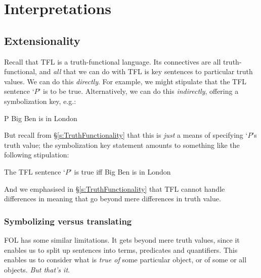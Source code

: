 \part{Interpretations}
\label{ch.semantics}


\chapter{Extensionality}\label{s:Interpretations}

Recall that TFL is a truth-functional language. Its connectives are all truth-functional, and \emph{all} that we can do with TFL is key sentences to particular truth values. We can do this \emph{directly}. For example, we might stipulate that the TFL sentence `$P$' is to be true. Alternatively, we can do this \emph{indirectly}, offering a symbolization key, e.g.:
	\begin{ekey}
		\item[P] Big Ben is in London
	\end{ekey}
 But recall from \S\ref{s:TruthFunctionality} that this is \emph{just} a means of specifying `$P$'s truth value; the symbolization key statement amounts to something like the following stipulation: 
	\begin{ebullet}
		\item The TFL sentence `$P$' is true iff Big Ben is in London
	\end{ebullet}
And we emphasised in \S\ref{s:TruthFunctionality} that TFL cannot handle differences in meaning that go beyond mere differences in truth value. 

\section{Symbolizing versus translating}

FOL has some similar limitations. It gets beyond mere truth values, since it enables us to split up sentences into terms, predicates and quantifiers. This enables us to consider what is \emph{true of} some particular object, or of some or all objects. \emph{But that's it}.

